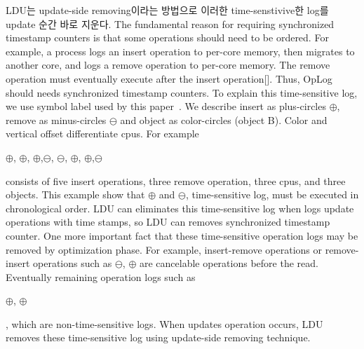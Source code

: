 LDU는 update-side removing이라는 방법으로 이러한 time-senstivive한 log를 update 순간 바로
지운다.
\else
The fundamental reason for requiring synchronized timestamp counters is that 
some operations should need to be ordered.
For example, a process logs an insert operation to per-core memory, then
migrates to another core, and logs a remove operation to per-core memory.
The remove operation must eventually execute after the insert operation[].
Thus, OpLog should needs synchronized timestamp counters.
To explain this time-sensitive log, we use symbol label used by this
paper~\cite{Clements15SCR}.
We describe insert as plus-circles $\oplus$, remove as minus-circles
$\ominus$ and object as color-circles (object B). 
Color and vertical offset differentiate cpus.
For example
\begin{center}
$\oplus$, $\oplus$, $\oplus$,$\ominus$,
$\ominus$, $\oplus$, $\oplus$,$\ominus$
\end{center}
consists of five insert operations, three remove operation, three cpus, and
three objects.
This example show that $\oplus$ and $\ominus$,
time-sensitive log, must be executed in chronological order.
LDU can eliminates this time-sensitive log when logs update operations with time
stamps, so LDU can removes synchronized timestamp counter.
One more important fact that these time-sensitive operation logs may be removed
by optimization phase.
For example, insert-remove operations or remove-insert operations such as 
$\ominus$, $\oplus$ are cancelable operations before
the read.
Eventually remaining operation logs such as
\begin{center}
 $\oplus$, $\oplus$
\end{center}
, which are non-time-sensitive logs.
When updates operation occurs, LDU removes these time-sensitive log using
update-side removing technique.
\fi

